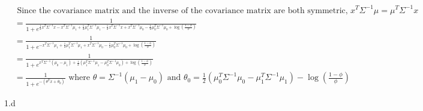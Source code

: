 \documentclass{article}
\newenvironment{answer}{\sf \begingroup\color{ForestGreen}}{\endgroup}%
\begin{document}
\begin{answer}
\begin{align*}
    &\text{ Since the covariance matrix and the inverse of the covariance matrix are both symmetric, } x^T\Sigma^{-1}\mu = \mu^T\Sigma^{-1}x \\
    &= \frac{1}{1 + e^{\frac{1}{2}x^T\Sigma^{-1}x-x^T\Sigma^{-1}\mu_1+\frac{1}{2}\mu_1^T\Sigma^{-1}\mu_1 - \frac{1}{2}x^T\Sigma^{-1}x + x^T\Sigma^{-1}\mu_0-\frac{1}{2}\mu_0^T\Sigma^{-1}\mu_0 + \log\left(\frac{1-\phi}{\phi}\right)}} \\ 
    &= \frac{1}{1 + e^{-x^T\Sigma^{-1}\mu_1+\frac{1}{2}\mu_1^T\Sigma^{-1}\mu_1 + x^T\Sigma^{-1}\mu_0-\frac{1}{2}\mu_0^T\Sigma^{-1}\mu_0 + \log\left(\frac{1-\phi}{\phi}\right)}} \\ 
    &= \frac{1}{1 + e^{x^T\Sigma^{-1}(\mu_0-\mu_1)+\frac{1}{2}(\mu_1^T\Sigma^{-1}\mu_1 -\mu_0^T\Sigma^{-1}\mu_0) + \log\left(\frac{1-\phi}{\phi}\right)}} \\ 
    &= \frac{1}{1+ e^{-(\theta^Tx+\theta_0)}} \text{ where } \theta = \Sigma^{-1}(\mu_1-\mu_0) \text{ and } \theta_0 = \frac{1}{2}(\mu_0^T\Sigma^{-1}\mu_0 -\mu_1^T\Sigma^{-1}\mu_1) - \log\left(\frac{1-\phi}{\phi}\right)
  \end{align*}
\end{answer}
\clearpage

\LARGE
1.d
\normalsize
\end{document}
